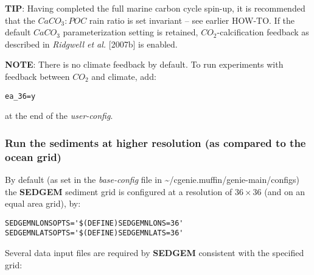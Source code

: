 \documentclass[11pt,fleqn]{book} %
\begin{document}
\noindent \textbf{TIP}: Having completed the full marine carbon cycle spin-up, it is recommended that the \(CaCO_{3}:POC\) rain ratio is set invariant -- see earlier HOW-TO. If the default \(CaCO_{3}\) parameterization setting is retained, \(CO_{2}\)-calcification feedback as described in \textit{Ridgwell et al.} [2007b] is enabled.

\noindent \textbf{NOTE}: There is no climate feedback by default. To run experiments with feedback between \(CO_{2}\) and climate, add:\vspace{-11pt}\begin{verbatim}ea_36=y\end{verbatim}\vspace{-11pt}
at the end of the \textit{user-config}.

%
\newpage
\subsubsection{Run the sediments at higher resolution (as compared to the ocean grid)}\label{Run the sediments at higher resolution}

By default (as set in the \textit{base-config} file in \textsf{\footnotesize \~{}/cgenie.muffin/genie-main/configs}) the \textbf{SEDGEM} sediment grid is configured at a resolution of \(36\times 36\) (and on an equal area grid), by:
\small\vspace{-1mm}\begin{verbatim}
SEDGEMNLONSOPTS='$(DEFINE)SEDGEMNLONS=36'
SEDGEMNLATSOPTS='$(DEFINE)SEDGEMNLATS=36'
\end{verbatim}\vspace{-1mm}\normalsize
Several data input files are required by \textbf{SEDGEM} consistent with the specified grid:
\end{document}
